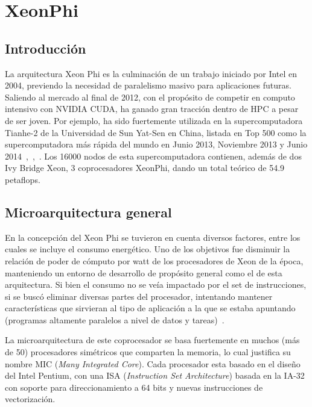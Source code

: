 
\section{XeonPhi}

\subsection{Introducci\'on}

La arquitectura Xeon Phi es la culminaci\'on de un trabajo iniciado por Intel en 2004, previendo
la necesidad de paralelismo masivo para aplicaciones futuras. Saliendo al mercado al final de 2012,
con el prop\'osito de competir en computo intensivo con NVIDIA CUDA, ha ganado gran tracci\'on dentro
de HPC a pesar de ser joven. Por ejemplo, ha sido fuertemente utilizada en la supercomputadora Tianhe-2 
de la Universidad de Sun Yat-Sen en China, listada en Top 500 como la supercomputadora m\'as r\'apida del
mundo en Junio 2013, Noviembre 2013 y Junio 2014~\cite{Top500XeonPhiJune2013},~\cite{Top500XeonPhiNov2013},~\cite{Top500XeonPhiJune2014}. 
Los 16000 nodos de esta supercomputadora contienen, adem\'as de dos Ivy Bridge Xeon, 3 coprocesadores
XeonPhi, dando un total te\'orico de 54.9 petaflops.

\subsection{Microarquitectura general} 

En la concepci\'on del Xeon Phi se tuvieron en cuenta diversos factores, entre los cuales
se incluye el consumo energ\'etico. Uno de los objetivos fue disminuir la relaci\'on de
poder de c\'omputo por watt de los procesadores de Xeon de la \'epoca, manteniendo un entorno
de desarrollo de prop\'osito general como el de esta arquitectura. 
Si bien el consumo no se ve\'ia impactado por el set de instrucciones, 
si se busc\'o eliminar diversas partes del procesador, intentando mantener 
caracter\'isticas que sirvieran al tipo de aplicaci\'on a la que se estaba 
apuntando (programas altamente paralelos a nivel de datos y tareas)~\cite{BookXeonPhi}.

La microarquitectura de este coprocesador se basa fuertemente en muchos (m\'as de 50) procesadores sim\'etricos que comparten la memoria, lo
cual justifica su nombre MIC (\textit{Many Integrated Core}). Cada procesador esta basado
en el dise\~no del Intel Pentium, con una ISA (\textit{Instruction Set Architecture}) basada en la IA-32 con
soporte para direccionamiento a 64 bits y nuevas instrucciones de vectorizaci\'on.

